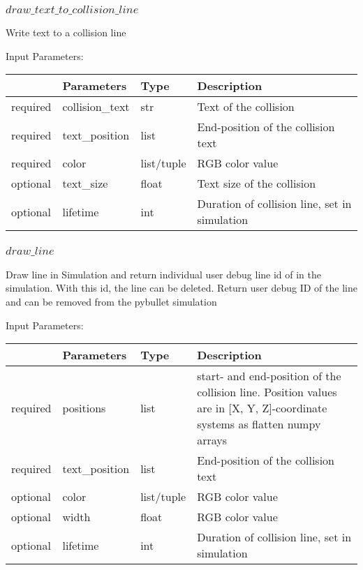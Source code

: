 \documentclass[
	ngerman,
	accentcolor=9c,%
	type=intern,
	marginpar=false
	]{tudapub}
\begin{document}
\subsubsection{$draw\_text\_to\_collision\_line$}
\noindent Write text to a collision line



\vspace{0.5cm}
\noindent Input Parameters:
\vspace{0.5cm}

\begin{tabular}{|p{}|p{}|p{}| p{}|}
\hline
 & \textbf{Parameters} & \textbf{Type} & \textbf{Description} \\
\hline
required & collision\_text & str & Text of the collision \\
\hline
required & text\_position & list & End-position of the collision text\\
\hline
required & color & list/tuple & RGB color value\\
\hline
optional & text\_size & float & Text size of the collision\\
\hline
optional & lifetime & int & Duration of collision line, set in simulation\\
\hline
\end{tabular}
\vspace{0.5cm}





\subsubsection{$draw\_line$}
\noindent Draw line in Simulation and return individual user debug line id of in the simulation.
    With this id, the line can be deleted. Return user debug ID of the line and can be removed from the pybullet simulation



\vspace{0.5cm}
\noindent Input Parameters:
\vspace{0.5cm}

\begin{tabular}{|p{}|p{}|p{}| p{}|}
\hline
 & \textbf{Parameters} & \textbf{Type} & \textbf{Description} \\
\hline
required & positions & list & start- and end-position of the collision line. Position values are in [X, Y, Z]-coordinate systems as flatten numpy arrays \\
\hline
required & text\_position & list & End-position of the collision text\\
\hline
optional & color & list/tuple & RGB color value\\
\hline
optional & width & float & RGB color value\\
\hline
optional & lifetime & int & Duration of collision line, set in simulation\\
\hline
\end{tabular}
\vspace{0.5cm}
\end{document}
